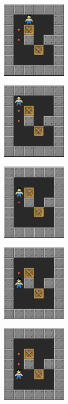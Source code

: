 \documentclass[10pt, final]{article}
\begin{document}
		\begin{figure}[h!]
			{
				\begin{subfigure}[h!]{1.3in}
					\includegraphics[height=1.5in]{q6.png}
				\end{subfigure}
				\begin{subfigure}[h!]{1.3in}
					\includegraphics[height=1.5in]{q7.png}
				\end{subfigure}
				\begin{subfigure}[h!]{1.3in}
					\includegraphics[height=1.5in]{q8.png}
				\end{subfigure}
				\begin{subfigure}[h!]{1.3in}
					\includegraphics[height=1.5in]{q9.png}
				\end{subfigure}
				\begin{subfigure}[h!]{1.3in}
					\includegraphics[height=1.5in]{q10.png}
			\end{subfigure}}
			\label{fig:chain}
		\end{figure}
\end{document}
